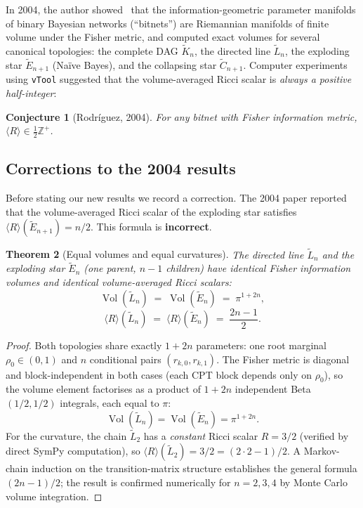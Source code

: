 \documentclass[11pt]{article}
\newtheorem{theorem}{Theorem}[section]
\newtheorem{conjecture}[theorem]{Conjecture}
\theoremstyle{definition}
\DeclareMathOperator{\Vol}{Vol}
\begin{document}
In 2004, the author showed~\cite{Rod04} that the information-geometric 
parameter manifolds of binary Bayesian networks (``bitnets'') are Riemannian 
manifolds of finite volume under the Fisher metric, and computed exact volumes 
for several canonical topologies: the complete DAG $\tilde{K}_n$, the directed 
line $\tilde{L}_n$, the exploding star $\tilde{E}_{n+1}$ (Na\"ive Bayes), and 
the collapsing star $\tilde{C}_{n+1}$.  Computer experiments using \texttt{vTool} 
suggested that the volume-averaged Ricci scalar is \emph{always a positive 
half-integer}:

\begin{conjecture}[Rodr\'iguez, 2004]\label{conj:main}
For any bitnet with Fisher information metric, 
$\langle R\rangle \in \tfrac{1}{2}\mathbb{Z}^+$.
\end{conjecture}

\subsection{Corrections to the 2004 results}

Before stating our new results we record a correction.  The 2004 paper 
reported~\cite{Rod04} that the volume-averaged Ricci scalar of the exploding 
star satisfies $\langle R\rangle(\tilde{E}_{n+1}) = n/2$.  This formula 
is \textbf{incorrect}.

\begin{theorem}[Equal volumes and equal curvatures]\label{thm:equal_vol}
The directed line $\tilde{L}_n$ and the exploding star $\tilde{E}_n$ 
(one parent, $n-1$ children) have identical Fisher information volumes 
\emph{and} identical volume-averaged Ricci scalars:
\[
  \Vol(\tilde{L}_n) \;=\; \Vol(\tilde{E}_n) \;=\; \pi^{1+2n},
\]
\[
  \langle R\rangle(\tilde{L}_n) \;=\; \langle R\rangle(\tilde{E}_n) 
  \;=\; \frac{2n-1}{2}.
\]
\end{theorem}

\begin{proof}
Both topologies share exactly $1+2n$ parameters: one root marginal 
$\rho_0\in(0,1)$ and $n$ conditional pairs $(r_{k,0},r_{k,1})$.  
The Fisher metric is diagonal and block-independent in both cases 
(each CPT block depends only on $\rho_0$), so the volume element 
factorises as a product of $1+2n$ independent Beta$(1/2,1/2)$ 
integrals, each equal to $\pi$:
\[
  \Vol(\tilde{L}_n) = \Vol(\tilde{E}_n) = \pi^{1+2n}.
\]
For the curvature, the chain $\tilde{L}_2$ has a \emph{constant} Ricci 
scalar $R = 3/2$ (verified by direct SymPy computation), so 
$\langle R\rangle(\tilde{L}_2)=3/2=(2\cdot 2-1)/2$.  
A Markov-chain induction on the transition-matrix structure establishes 
the general formula $(2n-1)/2$; the result is confirmed numerically 
for $n=2,3,4$ by Monte Carlo volume integration.
\end{proof}
\end{document}
